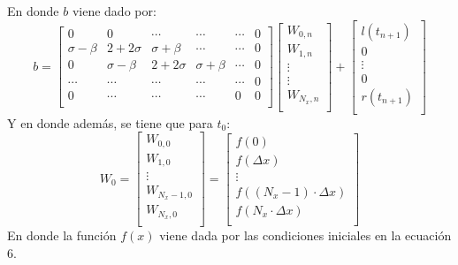 \documentclass[letterpaper]{article}
\newcommand{\5}
{
\\[.5cm]
}
\begin{document}
\begin{itemize}
En donde $b$ viene dado por:
\begin{equation}
	b =
    \begin{bmatrix}
    0       & 0 & \cdots & \cdots & \cdots & 0 \\
    \sigma - \beta       & 2+2\sigma & \sigma + \beta & \cdots & \cdots & 0 \\
    0 & \sigma - \beta       & 2+2\sigma & \sigma + \beta & \cdots & 0 \\
    \cdots & \cdots & \cdots & \cdots  & \cdots & 0\\
    0 & \cdots & \cdots & \cdots  & 0 & 0 \\
	\end{bmatrix}
    \begin{bmatrix}
    W_{0, n} \\
    W_{1, n} \\
    \vdots \\
    \vdots \\
    W_{N_{x}, n} \\
    \end{bmatrix}
   +
   \begin{bmatrix}
    l(t_{n+1}) \\
    0 \\
    \vdots \\
    0 \\
    r(t_{n+1}) \\
    \end{bmatrix}    
\end{equation}
Y en donde además, se tiene que para $t_0$:
\begin{equation}
	W_0 =
    \begin{bmatrix}
    W_{0, 0} \\
    W_{1, 0} \\
    \vdots \\
    W_{N_x-1, 0} \\
    W_{N_x, 0} \\
    \end{bmatrix} 
    =
    \begin{bmatrix}
    f(0) \\
    f(\Delta x) \\
    \vdots \\
    f( (N_x-1) \cdot \Delta x) \\
    f(N_x \cdot \Delta x) \\
    \end{bmatrix} 
\end{equation}
En donde la función $f(x)$ viene dada por las condiciones iniciales en la ecuación 6. \\


\end{itemize}
\end{document}

